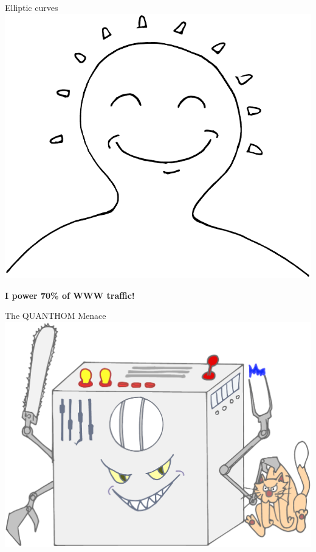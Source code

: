 \documentclass{beamer}
\begin{document}
\begin{frame}{Elliptic curves}
  \transdissolve
  \centering
  \includegraphics[height=0.7\textheight]{ec-happy}

  \Large\bf I power 70\% of WWW traffic!
\end{frame}


\begin{frame}{The QUANTHOM Menace}
  \centering
  \includegraphics[height=0.7\textheight]{qc-color}
\end{frame}

\end{document}
